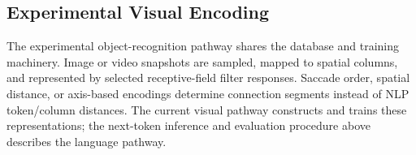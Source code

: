 \subsection{Experimental Visual Encoding}
The experimental object-recognition pathway shares the database and training machinery. Image or video snapshots are sampled, mapped to spatial columns, and represented by selected receptive-field filter responses. Saccade order, spatial distance, or axis-based encodings determine connection segments instead of NLP token/column distances. The current visual pathway constructs and trains these representations; the next-token inference and evaluation procedure above describes the language pathway.
